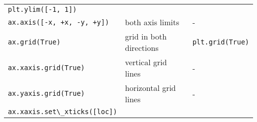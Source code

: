 \documentclass{book}
\newcommand{\passthrough}[1]{#1}
\begin{document}
\begin{longtable}[]{@{}lll@{}}
\begin{minipage}[t]{0.30\columnwidth}
\passthrough{\lstinline!plt.ylim([-1, 1])!}\strut
\end{minipage}\tabularnewline
\begin{minipage}[t]{0.30\columnwidth}\raggedright
\passthrough{\lstinline!ax.axis([-x, +x, -y, +y])!}\strut
\end{minipage} & \begin{minipage}[t]{0.30\columnwidth}\raggedright
both axis limits\strut
\end{minipage} & \begin{minipage}[t]{0.30\columnwidth}\raggedright
-\strut
\end{minipage}\tabularnewline
\begin{minipage}[t]{0.30\columnwidth}\raggedright
\passthrough{\lstinline!ax.grid(True)!}\strut
\end{minipage} & \begin{minipage}[t]{0.30\columnwidth}\raggedright
grid in both directions\strut
\end{minipage} & \begin{minipage}[t]{0.30\columnwidth}\raggedright
\passthrough{\lstinline!plt.grid(True)!}\strut
\end{minipage}\tabularnewline
\begin{minipage}[t]{0.30\columnwidth}\raggedright
\passthrough{\lstinline!ax.xaxis.grid(True)!}\strut
\end{minipage} & \begin{minipage}[t]{0.30\columnwidth}\raggedright
vertical grid lines\strut
\end{minipage} & \begin{minipage}[t]{0.30\columnwidth}\raggedright
-\strut
\end{minipage}\tabularnewline
\begin{minipage}[t]{0.30\columnwidth}\raggedright
\passthrough{\lstinline!ax.yaxis.grid(True)!}\strut
\end{minipage} & \begin{minipage}[t]{0.30\columnwidth}\raggedright
horizontal grid lines\strut
\end{minipage} & \begin{minipage}[t]{0.30\columnwidth}\raggedright
-\strut
\end{minipage}\tabularnewline
\begin{minipage}[t]{0.30\columnwidth}\raggedright
\passthrough{\lstinline!ax.xaxis.set\_xticks([loc])!}\strut
\end{minipage} & \begin{minipage}[t]{0.30\columnwidth}\raggedright

\end{minipage}
\end{longtable}
\end{document}

